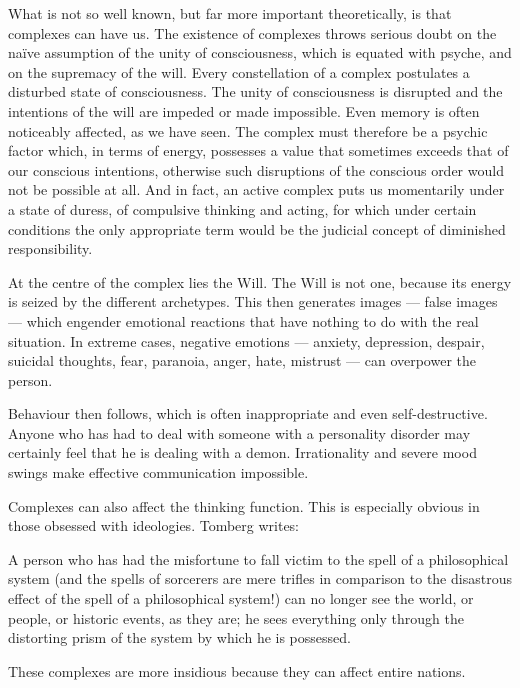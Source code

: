 \begin{quotex}
What is not so well known, but far more important theoretically, is that complexes can have us. The existence of complexes throws serious doubt on the naïve assumption of the unity of consciousness, which is equated with psyche, and on the supremacy of the will. Every constellation of a complex postulates a disturbed state of consciousness. The unity of consciousness is disrupted and the intentions of the will are impeded or made impossible. Even memory is often noticeably affected, as we have seen. The complex must therefore be a psychic factor which, in terms of energy, possesses a value that sometimes exceeds that of our conscious intentions, otherwise such disruptions of the conscious order would not be possible at all. And in fact, an active complex puts us momentarily under a state of duress, of compulsive thinking and acting, for which under certain conditions the only appropriate term would be the judicial concept of diminished responsibility. 

\end{quotex}
At the centre of the complex lies the Will. The Will is not one, because its energy is seized by the different archetypes. This then generates images — false images — which engender emotional reactions that have nothing to do with the real situation. In extreme cases, negative emotions — anxiety, depression, despair, suicidal thoughts, fear, paranoia, anger, hate, mistrust — can overpower the person.

Behaviour then follows, which is often inappropriate and even self-destructive. Anyone who has had to deal with someone with a personality disorder may certainly feel that he is dealing with a demon. Irrationality and severe mood swings make effective communication impossible.

Complexes can also affect the thinking function. This is especially obvious in those obsessed with ideologies. Tomberg writes:

\begin{quotex}
A person who has had the misfortune to fall victim to the spell of a philosophical system (and the spells of sorcerers are mere trifles in comparison to the disastrous effect of the spell of a philosophical system!) can no longer see the world, or people, or historic events, as they are; he sees everything only through the distorting prism of the system by which he is possessed. 

\end{quotex}
These complexes are more insidious because they can affect entire nations.


